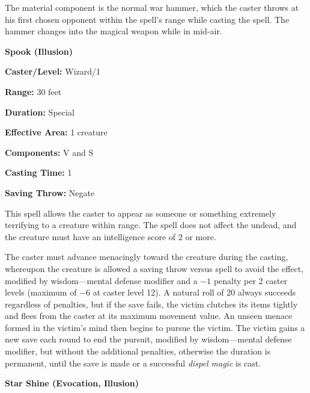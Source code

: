 \begin{multicols}{2}
The material component is the normal war hammer, which the caster throws at his first chosen opponent within the spell's range while casting the spell.  The hammer changes into the magical weapon while in mid-air.

\vspace{1em}

\noindent
\begin{minipage}{\columnwidth}

\noindent \textbf{Spook (Illusion)}

\noindent \textbf{Caster/Level:} Wizard/1

\noindent \textbf{Range:} 30 feet

\noindent \textbf{Duration:} Special

\noindent \textbf{Effective Area:} 1 creature

\noindent \textbf{Components:} V and S

\noindent \textbf{Casting Time:} 1

\noindent \textbf{Saving Throw:} Negate

\end{minipage}

This spell allows the caster to appear as someone or something extremely terrifying to a creature within range.  The spell does not affect the undead, and the creature must have an intelligence score of 2 or more.  

The caster must advance menacingly toward the creature during the casting, whereupon the creature is allowed a saving throw versus spell to avoid the effect, modified by wisdom---mental defense modifier and a $-1$ penalty per 2 caster levels (maximum of $-6$ at caster level 12).  A natural roll of 20 always succeeds regardless of penalties, but if the save fails, the victim clutches its items tightly and flees from the caster at its maximum movement value.  An unseen menace formed in the victim's mind then begins to pursue the victim.  The victim gains a new save each round to end the pursuit, modified by wisdom---mental defense modifier, but without the additional penalties, otherwise the duration is permanent, until the save is made or a successful \textit{dispel magic} is cast. 

\vspace{1em}

\noindent
\begin{minipage}{\columnwidth}

\noindent \textbf{Star Shine (Evocation, Illusion)}


\end{minipage}
\end{multicols}
